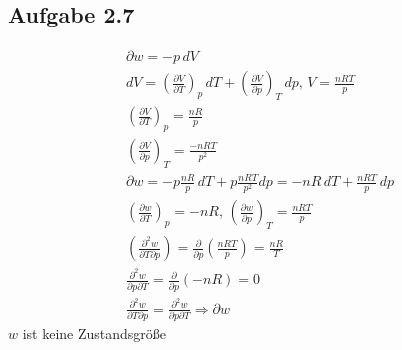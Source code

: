\documentclass{article}
\begin{document}
\subsection*{Aufgabe 2.7}
\begin{eqnarray*}
    \partial w = -p\,dV\\
    dV = \left(\frac{\partial V}{\partial T}\right)_p\,dT + \left(\frac{\partial V}{\partial p}\right)_T\,dp,\,V=\frac{nRT}{p}\\
    \left(\frac{\partial V}{\partial T}\right)_p = \frac{nR}{p}\\
    \left(\frac{\partial V}{\partial p}\right)_T = \frac{-nRT}{p^2}\\
    \partial w = -p\frac{nR}{p}\,dT + p \frac{nRT}{p^2}dp = -nR\,dT + \frac{nRT}{p}\,dp\\
    \left(\frac{\partial w}{\partial T}\right)_p = -nR,\, \left(\frac{\partial w}{\partial p}\right)_T = \frac{nRT}{p}\\
    \left(\frac{\partial^2 w}{\partial T \partial p}\right) = \frac{\partial}{\partial p}\left(\frac{nRT}{p}\right)=\frac{nR}{T}\\
    \frac{\partial^2 w}{\partial p \partial T} = \frac{\partial}{\partial p}(-nR) = 0\\
    \frac{\partial^2 w}{\partial T \partial p} = \frac{\partial^2 w}{\partial p \partial T} \Rightarrow \partial w
\end{eqnarray*}
$w$ ist keine Zustandsgröße
\end{document}
